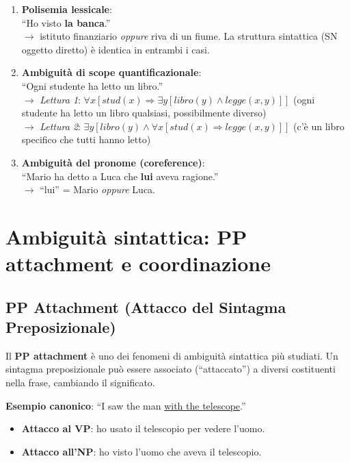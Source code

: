 \documentclass[12pt,a4paper]{article}
\begin{document}
\begin{enumerate}[leftmargin=1.5em, label=\arabic*.]
  \item \textbf{Polisemia lessicale}: \\
    ``Ho visto \textbf{la banca}.''\\
    $\to$ istituto finanziario \emph{oppure} riva di un fiume. La struttura sintattica (SN oggetto diretto) è identica in entrambi i casi.

  \item \textbf{Ambiguità di scope quantificazionale}: \\
    ``Ogni studente ha letto un libro.''\\
    $\to$ \emph{Lettura 1}: $\forall x[\mathit{stud}(x) \Rightarrow \exists y[\mathit{libro}(y) \wedge \mathit{legge}(x,y)]]$ (ogni studente ha letto un libro qualsiasi, possibilmente diverso)\\
    $\to$ \emph{Lettura 2}: $\exists y[\mathit{libro}(y) \wedge \forall x[\mathit{stud}(x) \Rightarrow \mathit{legge}(x,y)]]$ (c'è un libro specifico che tutti hanno letto)

  \item \textbf{Ambiguità del pronome (coreference)}: \\
    ``Mario ha detto a Luca che \textbf{lui} aveva ragione.''\\
    $\to$ ``lui'' = Mario \emph{oppure} Luca.
\end{enumerate}

\section{Ambiguità sintattica: PP attachment e coordinazione}

\subsection{PP Attachment (Attacco del Sintagma Preposizionale)}

Il \textbf{PP attachment} è uno dei fenomeni di ambiguità sintattica più studiati. Un sintagma preposizionale può essere associato (``attaccato'') a diversi costituenti nella frase, cambiando il significato.

\textbf{Esempio canonico}: ``I saw the man \underline{with the telescope}.''
\begin{itemize}[leftmargin=1.5em]
  \item \textbf{Attacco al VP}: ho usato il telescopio per vedere l'uomo.
  \item \textbf{Attacco all'NP}: ho visto l'uomo che aveva il telescopio.
\end{itemize}
\end{document}
